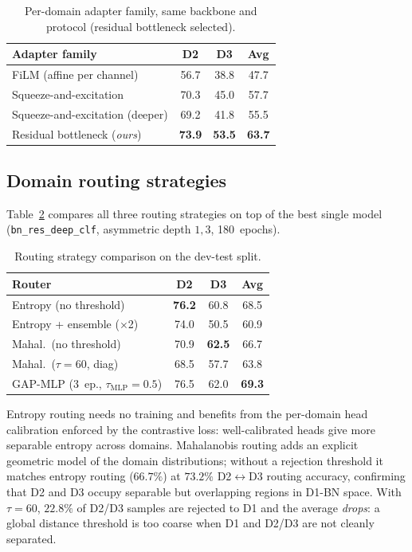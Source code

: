 \documentclass[9pt,conference]{IEEEtran}
\begin{document}
\begin{table}[t]
  \centering
  \caption{Per-domain adapter family, same backbone and protocol
           (residual bottleneck selected).}
  \label{tab:adapter}
  \begin{tabularx}{\columnwidth}{Xccc}
    \toprule
    Adapter family & D2 & D3 & Avg \\
    \midrule
    FiLM (affine per channel)        & 56.7 & 38.8 & 47.7 \\
    Squeeze-and-excitation           & 70.3 & 45.0 & 57.7 \\
    Squeeze-and-excitation (deeper)  & 69.2 & 41.8 & 55.5 \\
    Residual bottleneck (\emph{ours}) & \textbf{73.9} & \textbf{53.5} & \textbf{63.7} \\
    \bottomrule
  \end{tabularx}
\end{table}

\subsection{Domain routing strategies}
\label{ssec:routing_results}

Table~\ref{tab:routing} compares all three routing strategies on top of
the best single model (\texttt{bn\_res\_deep\_clf}, asymmetric depth
$1,3$, 180~epochs).

\begin{table}[t]
  \centering
  \caption{Routing strategy comparison on the dev-test split.}
  \label{tab:routing}
  \begin{tabularx}{\columnwidth}{Xccc}
    \toprule
    Router & D2 & D3 & Avg \\
    \midrule
    Entropy (no threshold)         & \textbf{76.2} & 60.8 & 68.5 \\
    Entropy + ensemble ($\times$2) & 74.0 & 50.5 & 60.9 \\
    Mahal.\ (no threshold)         & 70.9 & \textbf{62.5} & 66.7 \\
    Mahal.\ ($\tau=60$, diag)      & 68.5 & 57.7 & 63.8 \\
    GAP-MLP (3~ep., $\tau_{\text{MLP}}=0.5$) & 76.5 & 62.0 & \textbf{69.3} \\
    \bottomrule
  \end{tabularx}
\end{table}

Entropy routing needs no training and benefits from the per-domain head
calibration enforced by the contrastive loss: well-calibrated heads give
more separable entropy across domains. Mahalanobis routing adds an explicit
geometric model of the domain distributions; without a rejection threshold
it matches entropy routing ($66.7\%$) at $73.2\%$ D2$\leftrightarrow$D3
routing accuracy, confirming that D2 and D3 occupy separable but
overlapping regions in D1-BN space. With $\tau=60$, $22.8\%$ of D2/D3
samples are rejected to D1 and the average \emph{drops}: a global distance
threshold is too coarse when D1 and D2/D3 are not cleanly separated.
\end{document}

